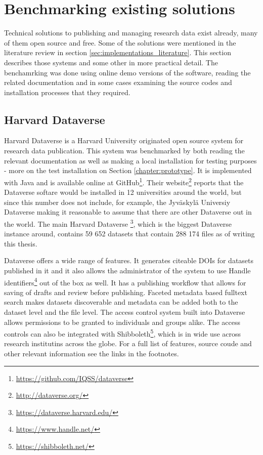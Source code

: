 \section{Benchmarking existing solutions}
\label{sec:benchmarking}

Technical solutions to publishing and managing research data exist already, many
of them open source and free. Some of the solutions were mentioned in the
literature review in section \ref{sec:implementations_literature}. This section describes
those systems and some other in more practical detail. The benchamrking was
done using online demo versions of the software, reading the related
documentation and in some cases examining the source codes and installation
processes that they required.

\subsection{Harvard Dataverse}

Harvard Dataverse is a Harvard University originated open source system
for research data publication. This system was benchmarked by both reading the
relevant documentation as well as making a local installation for testing
purposes - more on the test installation on Section \ref{chapter:prototype}.
It is implemented with Java and is available
online at GitHub\footnote{\url{https://github.com/IQSS/dataverse}}. Their
website\footnote{\url{http://dataverse.org/}} reports that the Dataverse
softare would be installed in 12 universities around the world, but since this
number does not include, for example, the Jyväskylä Universiy Dataverse making
it reasonable to assume that there are other Dataverse out in the world. The
main Harvard Dataverse \footnote{\url{https://dataverse.harvard.edu/}}, which
is the biggest Dataverse instance around, contains 59 652 datasets that contain
288 174 files as of writing this thesis.

Dataverse offers a wide range of features. It generates citeable DOIs for
datasets published in it and it also allows the administrator of the system
to use Handle identifiers\footnote{\url{https://www.handle.net/}} out of the
box as well. It has a publishing workflow that allows for saving of drafts and
review before publishing. Faceted metadata based fulltext search makes datasets
discoverable and metadata can be added both to the dataset level and the file
level. The access control system built into Dataverse allows permissions to be
granted to individuals and groups alike. The access controls can also be
integrated with Shibboleth\footnote{\url{https://shibboleth.net/}}, which is in
wide use across research institutins across the globe. For a full list of
features, source coude and other relevant information see the links in the
footnotes.

